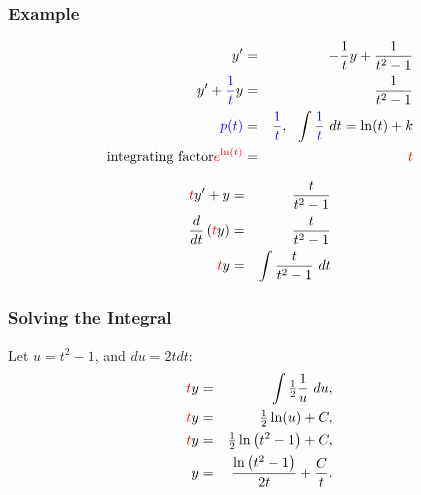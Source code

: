 \begin{frame}
  \frametitle{Example}

  \vspace*{-3em}
  \begin{eqnarray*}
    y' & = & -\frac{1}{t} y + \frac{1}{t^2 -1} \\
    y' + {\color{blue}\frac{1}{t}} y & = & \frac{1}{t^2 -1} \\
    {\color{blue}p(t)} & = & {\color{blue}\frac{1}{t}}, ~~  \int {\color{blue}\frac{1}{t}} ~ dt  =  \ln(t) + k \\
    \text{integrating factor} {\color{red}e^{\ln(t)}} & = & {\color{red}t}
  \end{eqnarray*}

  \begin{eqnarray*}
    \redText{t} y' + y & = & \frac{t}{t^2-1} \\
    \frac{d}{dt} \lp \redText{t} y \rp & = & \frac{t}{t^2-1} \\
    \redText{t} y & = & \int \frac{t}{t^2-1} ~ dt
%
%
%
 \end{eqnarray*}

\end{frame}


\begin{frame}
  \frametitle{Solving the Integral}

  Let $u=t^2-1$, and $du=2tdt$:
  \begin{eqnarray*}
    {\color{red}t}y & = & \int \mbox{$\frac{1}{2}$} \frac{1}{u} ~ du, \\
    {\color{red}t} y & = & \mbox{$\frac{1}{2}$} \ln(u) + C, \\
    {\color{red}t} y & = & \mbox{$\frac{1}{2}$} \ln \left( t^2 - 1 \right) + C, \\
    y & = & \frac{\ln\left( t^2-1 \right)}{2t} + \frac{C}{t}.
  \end{eqnarray*}

\end{frame}


